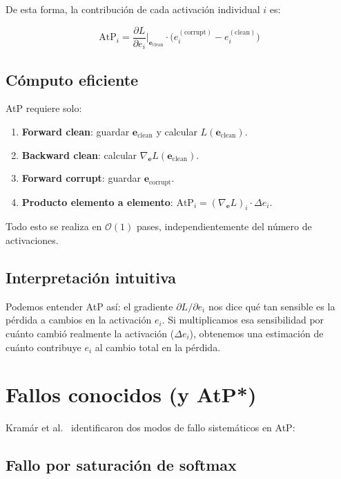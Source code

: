 \documentclass[11pt,a4paper]{report}
\theoremstyle{definition}
\begin{document}
De esta forma, la contribución de cada activación individual $i$ es:

\[
\text{AtP}_i = \frac{\partial L}{\partial e_i}\bigg|_{\mathbf{e}_{\text{clean}}} \cdot \big(e_i^{(\text{corrupt})} - e_i^{(\text{clean})}\big)
\]

\subsection{Cómputo eficiente}

AtP requiere solo:

\begin{enumerate}
    \item \textbf{Forward clean}: guardar $\mathbf{e}_{\text{clean}}$ y calcular $L(\mathbf{e}_{\text{clean}})$.
    \item \textbf{Backward clean}: calcular $\nabla_{\mathbf{e}} L(\mathbf{e}_{\text{clean}})$.
    \item \textbf{Forward corrupt}: guardar $\mathbf{e}_{\text{corrupt}}$.
    \item \textbf{Producto elemento a elemento}: $\text{AtP}_i = (\nabla_{\mathbf{e}} L)_i \cdot \Delta e_i$.
\end{enumerate}

Todo esto se realiza en $\mathcal{O}(1)$ pases, independientemente del número de activaciones.

\subsection{Interpretación intuitiva}

Podemos entender AtP así: el gradiente $\partial L / \partial e_i$ nos dice qué tan sensible es la pérdida a cambios en la activación $e_i$. Si multiplicamos esa sensibilidad por cuánto cambió realmente la activación ($\Delta e_i$), obtenemos una estimación de cuánto contribuye $e_i$ al cambio total en la pérdida.

\section{Fallos conocidos (y AtP*)}

Kramár et al.~\cite{kramar2024atpstar} identificaron dos modos de fallo sistemáticos en AtP:

\subsection{Fallo por saturación de softmax}
\end{document}
